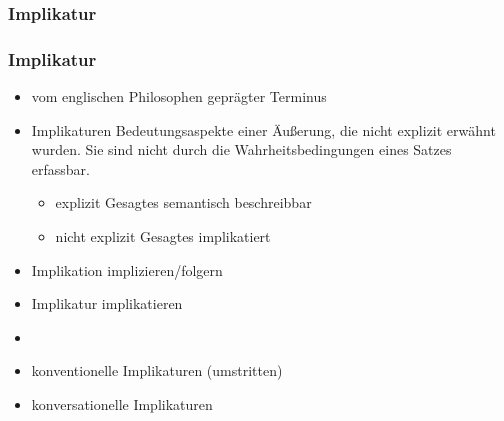 %
\subsubsection{Implikatur}
%


\begin{frame}
\frametitle{Implikatur}

\begin{itemize}
	\item vom englischen Philosophen \citet{Grice89a} geprägter Terminus
	\item[]
\begin{block}{Implikaturen}
	Bedeutungsaspekte einer Äu\ss{}erung, die nicht explizit erwähnt wurden. Sie sind nicht durch die Wahrheitsbedingungen eines Satzes erfassbar.
\end{block}	


	\begin{itemize}
		\item explizit Gesagtes \ras semantisch beschreibbar
		\item nicht explizit Gesagtes \ras implikatiert
	\end{itemize}


	\item Implikation \ras implizieren/folgern
	\item Implikatur \ras implikatieren
	\item[]
	\item konventionelle Implikaturen (umstritten)
	\item konversationelle Implikaturen
\end{itemize}

\end{frame}



